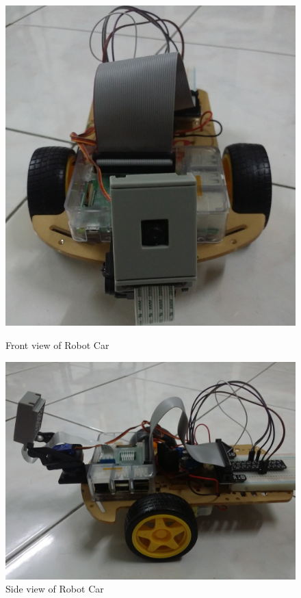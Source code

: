 \begin{figure}[htb]
  \includegraphics[width=0.8\columnwidth]{images/RobotCar_FrontView.jpg}
  \caption{Front view of Robot Car}\label{F:robotfront}

  \includegraphics[width=0.8\columnwidth]{images/RobotCar_SideView.jpg}
  \caption{Side view of Robot Car}\label{F:robotside}


\end{figure}
